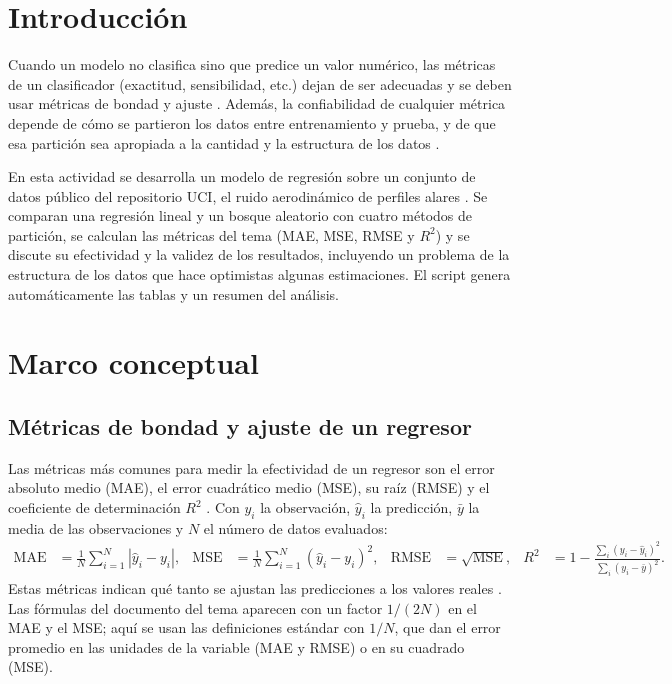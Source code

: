 \documentclass[11pt,letterpaper]{article}
\begin{document}
\portada
\indicegeneral


\section{Introducción}

Cuando un modelo no clasifica sino que predice un valor numérico, las métricas de un clasificador (exactitud, sensibilidad, etc.) dejan de ser adecuadas y se deben usar métricas de bondad y ajuste \parencite{tecnm2026_tema33}. Además, la confiabilidad de cualquier métrica depende de cómo se partieron los datos entre entrenamiento y prueba, y de que esa partición sea apropiada a la cantidad y la estructura de los datos \parencite{tecnm2026_tema33}.

En esta actividad se desarrolla un modelo de regresión sobre un conjunto de datos público del repositorio UCI, el ruido aerodinámico de perfiles alares \parencite{brooks1989}. Se comparan una regresión lineal y un bosque aleatorio con cuatro métodos de partición, se calculan las métricas del tema (MAE, MSE, RMSE y $R^2$) y se discute su efectividad y la validez de los resultados, incluyendo un problema de la estructura de los datos que hace optimistas algunas estimaciones. El script genera automáticamente las tablas y un resumen del análisis.

\section{Marco conceptual}

\subsection{Métricas de bondad y ajuste de un regresor}

Las métricas más comunes para medir la efectividad de un regresor son el error absoluto medio (MAE), el error cuadrático medio (MSE), su raíz (RMSE) y el coeficiente de determinación $R^2$ \parencite{tecnm2026_tema33}. Con $y_i$ la observación, $\hat{y}_i$ la predicción, $\bar{y}$ la media de las observaciones y $N$ el número de datos evaluados:
\begin{align*}
\text{MAE} &= \frac{1}{N}\sum_{i=1}^{N} |\hat{y}_i - y_i|, &
\text{MSE} &= \frac{1}{N}\sum_{i=1}^{N} (\hat{y}_i - y_i)^2, &
\text{RMSE} &= \sqrt{\text{MSE}}, &
R^2 &= 1 - \frac{\sum_i (y_i - \hat{y}_i)^2}{\sum_i (y_i - \bar{y})^2}.
\end{align*}
Estas métricas indican qué tanto se ajustan las predicciones a los valores reales \parencite{tecnm2026_tema33}. Las fórmulas del documento del tema aparecen con un factor $1/(2N)$ en el MAE y el MSE; aquí se usan las definiciones estándar con $1/N$, que dan el error promedio en las unidades de la variable (MAE y RMSE) o en su cuadrado (MSE).
\end{document}
